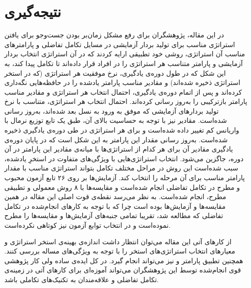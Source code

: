 \documentclass[12pt,a4paper]{article}
\theoremstyle{definition}
\theoremstyle{theorem}
\theoremstyle{definition}
\begin{document}


\newpage
\section{نتیجه‌گیری}

در این مقاله‌، پژوهشگران برای رفع مشکل زمان‌بر بودن جست‌وجو برای یافتن استراتژی مناسب برای تولید بردار آزمایشی در مسایل تکامل تفاضلی و پارامترهای مناسب آن استراتژی، روشی خود تطبیقی ارایه کردند که در آن استراتژی انتخاب بردار آزمایشی و پارامتر
متناسب هر استراتژی را در افراد قرار داده‌اند تا تکامل پیدا کند، به این شکل که در طول دوره‌ی یادگیری، نرخ موفقیت هر استراتژی (که در استخر استراتژی ذخیره شده‌اند) و مقادیر مناسب پارامتر یادشده را در حافظه‌هایی نگه‌داری کرده‌اند و پس از اتمام دوره‌ی یادگیری، احتمال انتخاب هر استراتژی و مقادیر مناسب پارامتر بازترکیبی را به‌روز رسانی کرده‌اند. احتمال انتخاب هر استراتژی، متناسب با نرخ تولید بردارهای آزمایشی که موفق به ورود به نسل بعد شده‌اند، به‌روز رسانی شده‌است. مقادیر 
نیز با توجه به حساسیت بالای آن، طبق یک تابع توزیع نرمال با واریانس کم تغییر داده شده‌است و برای هر استراتژی در طی دوره‌ی یادگیری ذخیره شده‌است. به‌روز رسانی مقدار این پارامتر به این شکل است که در پایان دوره‌ی یادگیری مقادیر آن برای هر کدام از استراتژی‌ها با میانه‌ی مقادیر این پارامتر در آن دوره، جاگزین می‌شود. انتخاب استراتژی‌هایی با ویژگی‌های متفاوت در استخرِ یاد‌شده، سبب شده‌است این روش در مراحل مختلف تکامل بتواند استراتژی مناسب با مقدار پارامتر مناسب برای آن مرحله را انتخاب کند. آزمایش‌ها بر روی ۲۶ تابع آزمون محبوب و مطرح در تکامل تفاضلی انجام شده‌است و مقایسه‌ها با ۸ روش معمولی و تطبیقی مطرح، انجام شده‌است. به نظر می‌رسد نقطه‌ی قوت اصلی این مقاله در همین مقایسه‌ها و آزمایش‌ها بوده است چرا که با توجه به کارهای انجام‌شده در تکامل تفاضلی که مطالعه شد، تقریبا تمامی جنبه‌های آزمایش‌ها و مقایسه‌ها را مطرح نموده‌است و در انتخاب توابع آزمون نیز کوتاهی نکرده‌است.

 از کارهای آتی این مقاله می‌توان انتظار داشت اندازه‌ی بهینه‌ی استخر استراتژی و معیارهای انتخاب استراتژی‌های استخر را با توجه به ویژگی‌های مساله بررسی کنند. همچنین تطبیق پارامتر 
و 
نیز می‌تواند انجام گیرد. در کل ایده‌ی ساده ولی کار پژوهشی قوی انجام‌شده توسط این پژوهشگران می‌تواند آموزه‌ای برای کارهای آتی در زمینه‌ی تکامل تفاضلی و علاقه‌مندان به تکنیک‌های تکاملی باشد. 


\newpage
\end{document}
